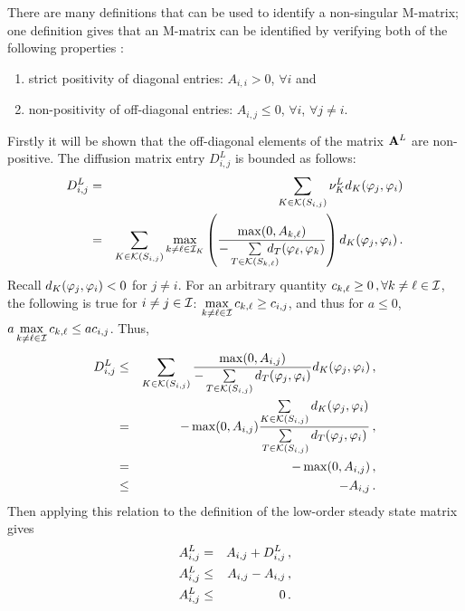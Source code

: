 
\begin{prf}
  There are many definitions that can be used to identify a non-singular
  M-matrix; one
  definition gives that an M-matrix can be identified by verifying both of the
  following properties \cite{plemmons}:
  \begin{enumerate}
    \item strict positivity of diagonal entries: $A_{i,i} > 0$, $\forall i$ and
    \item non-positivity of off-diagonal entries: $A_{i,j} \leq 0$,
      $\forall i$, $\forall j\ne i$.
  \end{enumerate}
Firstly it will be shown that the off-diagonal elements of the matrix
$\A^L$ are non-positive.
The diffusion matrix entry $D^L_{i,j}$ is bounded as follows:
\begin{eqnarray*}
   D_{i,j}^L & = & \sumKSij\nu^L_K d_K(\test_j,\test_i)\\
          & = & \sumKSij\max\limits_{k\ne \ell\in \indices_K}
            \pr{\frac{\max(0,A_{k,\ell})}
              {-\sum\limits_{T\in\mathcal{K}(S_{k,\ell})}
              \mkern-20mu d_T(\test_\ell,\test_k)}} d_K(\test_j,\test_i) \eqp
\end{eqnarray*}
Recall $d_K(\test_j,\test_i) < 0$ for $j\ne i$.
For an arbitrary quantity $c_{k,\ell} \geq 0 \eqc \forall k\ne\ell\in\indices$,
the following is true for $i\ne j\in\indices$:
$\max\limits_{k\ne\ell\in\indices}c_{k,\ell} \geq c_{i,j}$, and thus for $a\leq 0$,
$a\max\limits_{k\ne\ell\in\indices}c_{k,\ell} \leq a c_{i,j}$.
Thus,
\begin{eqnarray*}
   D^L_{i,j} & \le & \sumKSij \frac{\max(0,A_{i,j})}
    {-\sumKSij[T] d_T(\test_j,\test_i)}
    d_K(\test_j,\test_i) \eqc\\
      & = & -\max(0,A_{i,j}) \frac{\sumKSij d_K(\test_j,\test_i)}
        {\sumKSij[T] d_T(\test_j,\test_i)} \eqc\\
        & = & -\max(0,A_{i,j}) \eqc\\
        & \le & -A_{i,j} \eqp
\end{eqnarray*}
Then applying this relation to the definition of the low-order steady state
matrix gives
\begin{eqnarray*}
  A^L_{i,j} &  =  & A_{i,j} + D_{i,j}^L \eqc\\
  A^L_{i,j} & \le & A_{i,j} - A_{i,j}   \eqc\\
  A^L_{i,j} & \le & 0 \eqp

\end{eqnarray*}
\end{prf}
